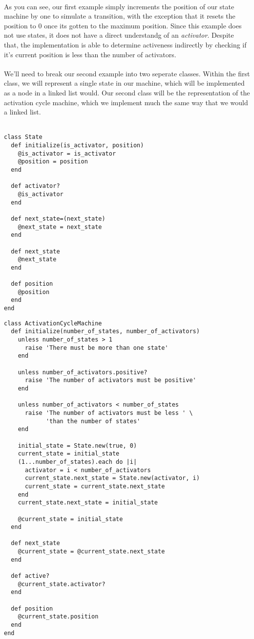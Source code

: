 \documentclass[a4paper,12pt]{article}
\begin{document}
\noindent
\\
As you can see, our first example simply increments the position of our state machine by one to simulate a transition, with the exception that it resets the position to 0 once its gotten to the maximum position. Since this example does not use states, it does not have a direct understandg of an \textit{activator}. Despite that, the implementation is able to determine activeness indirectly by checking if it's current position is less than the number of activators.\\
\\
We'll need to break our second example into two seperate classes. Within the first class, we will represent a single state in our machine, which will be implemented as a node in a linked list would. Our second class will be the representation of the activation cycle machine, which we implement much the same way that we would a linked list.\\
\\
\begin{tcolorbox}
\begin{verbatim}
class State
  def initialize(is_activator, position)
    @is_activator = is_activator
    @position = position
  end

  def activator?
    @is_activator
  end
  
  def next_state=(next_state)
  	@next_state = next_state
  end
  
  def next_state
  	@next_state
  end
  
  def position
  	@position
  end
end
\end{verbatim}
\end{tcolorbox}
\begin{tcolorbox}
\begin{verbatim}
class ActivationCycleMachine
  def initialize(number_of_states, number_of_activators)
    unless number_of_states > 1
      raise 'There must be more than one state'
    end

    unless number_of_activators.positive?
      raise 'The number of activators must be positive'
    end

    unless number_of_activators < number_of_states
      raise 'The number of activators must be less ' \
            'than the number of states'
    end

    initial_state = State.new(true, 0)
    current_state = initial_state
    (1...number_of_states).each do |i|
      activator = i < number_of_activators
      current_state.next_state = State.new(activator, i)
      current_state = current_state.next_state
    end
    current_state.next_state = initial_state

    @current_state = initial_state
  end

  def next_state
    @current_state = @current_state.next_state
  end

  def active?
    @current_state.activator?
  end

  def position
    @current_state.position
  end
end
\end{verbatim}
\end{tcolorbox}
\end{document}
